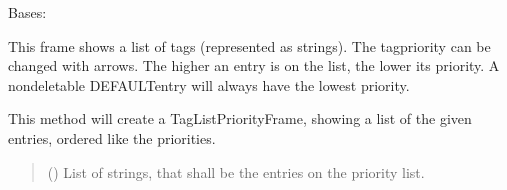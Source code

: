 \documentclass[letterpaper,10pt,english]{sphinxmanual}
\begin{document}
\begin{fulllineitems}
\label{\detokenize{apidoc/src.osm_configurator.view.utilityframes:src.osm_configurator.view.utilityframes.tag_list_priority_frame.TagListPriorityFrame}}
\pysigstartsignatures
{}
\pysigstopsignatures
\sphinxAtStartPar
Bases: 

\sphinxAtStartPar
This frame shows a list of tags (represented as strings). The tag\sphinxhyphen{}priority can be changed with arrows.
The higher an entry is on the list, the lower its priority.
A non\sphinxhyphen{}deletable DEFAULT\sphinxhyphen{}entry will always have the lowest priority.

\begin{fulllineitems}
\label{\detokenize{apidoc/src.osm_configurator.view.utilityframes:src.osm_configurator.view.utilityframes.tag_list_priority_frame.TagListPriorityFrame.__init__}}
\pysigstartsignatures
{}
\pysigstopsignatures
\sphinxAtStartPar
This method will create a TagListPriorityFrame, showing a list of the given entries, ordered like the priorities.
\begin{quote}\begin{description}
\sphinxAtStartPar
{}\sphinxstyleliteralstrong{\sphinxupquote{{[}}}\sphinxstyleliteralstrong{\sphinxupquote{{]}}} () \textendash{} List of strings, that shall be the entries on the priority list.

\end{description}\end{quote}

\end{fulllineitems}



\end{fulllineitems}
\end{document}
